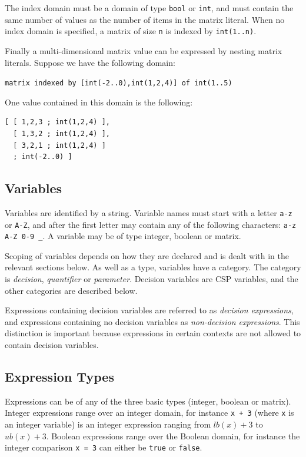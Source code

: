 \documentclass[a4paper]{article}
\begin{document}
The index domain must be a domain of type \texttt{bool} or \texttt{int}, and must 
contain the same number of values as the number of items in the matrix literal. 
When no index domain is specified, a matrix of size \texttt{n} is indexed by \texttt{int(1..n)}. 

Finally a multi-dimensional matrix value can be expressed by nesting matrix literals.
Suppose we have the following domain:

\begin{center}
\texttt{matrix indexed by [int(-2..0),int(1,2,4)] of int(1..5)}
\end{center}

One value contained in this domain is the following:

\begin{verbatim}
[ [ 1,2,3 ; int(1,2,4) ],
  [ 1,3,2 ; int(1,2,4) ],
  [ 3,2,1 ; int(1,2,4) ]
  ; int(-2..0) ]
\end{verbatim}

\subsection{Variables}\label{sec:vars}

Variables are identified by a string. Variable names must start with a letter 
\texttt{a-z} or \texttt{A-Z}, and after the first letter may contain any of
the following characters: \texttt{a-z A-Z 0-9 \_}. A variable may be of type
integer, boolean or matrix. 

Scoping of variables depends on how they are declared and is dealt with in the
relevant sections below. As well as a type, variables have a category. The 
category is \textit{decision}, \textit{quantifier} or \textit{parameter}. Decision
variables are CSP variables, and the other categories are described below. 

Expressions containing decision variables are referred to as \textit{decision expressions},
and expressions containing no decision variables as \textit{non-decision expressions}.
This distinction is important because expressions in certain contexts are not allowed
to contain decision variables. 

\subsection{Expression Types}

Expressions can be of any of the three basic types (integer, boolean or matrix). 
Integer expressions range over an integer domain, 
for instance {\tt x + 3} (where \texttt{x} is an integer variable) is an integer expression ranging from 
$lb(x)+3$ to $ub(x)+3$. Boolean expressions range over the 
Boolean domain, for instance the integer comparison 
 {\tt x = 3} can either be {\tt true}
or {\tt false}. 
\end{document}
